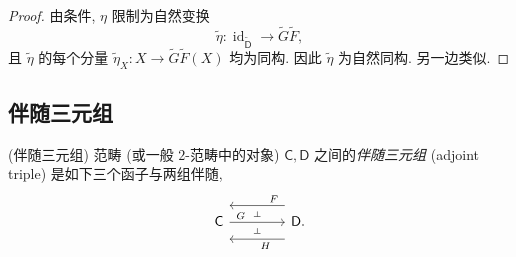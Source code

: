 \begin{proof}
	由条件, $\eta$ 限制为自然变换
	$$
	\widetilde \eta \colon
	\operatorname{id}_{\widetilde {\mathsf D}} \to \widetilde G \widetilde F,
	$$
	且 $\widetilde \eta$ 的每个分量 ${\widetilde \eta}_{X} \colon X \to \widetilde G \widetilde F (X)$ 均为同构.
	因此 $\widetilde \eta$ 为自然同构. 另一边类似.
\end{proof}

\subsection{伴随三元组}

\begin{definition}
	{(伴随三元组)}
	范畴 (或一般 $2$-范畴中的对象) $\mathsf {C},\mathsf {D}$ 之间的\emph{伴随三元组} (adjoint triple) 是如下三个函子与两组伴随,
	\[\begin{tikzcd}[ampersand replacement=\&,column sep=2em]
		{\mathsf {C}} \&\& {\mathsf {D}.}
		\arrow[""{name=0, anchor=center, inner sep=0}, "{G}"{pos=0.2}, from=1-1, to=1-3]
		\arrow[""{name=1, anchor=center, inner sep=0}, "{F}"'{pos=0.2}, shift right=5, from=1-3, to=1-1]
		\arrow[""{name=2, anchor=center, inner sep=0}, "{H}"{pos=0.35}, shift left=5, from=1-3, to=1-1]
		\arrow["\dashv"{anchor=center, rotate=-90}, draw=none, from=1, to=0]
		\arrow["\dashv"{anchor=center, rotate=-90}, draw=none, from=0, to=2]
	\end{tikzcd}\]
\end{definition}

